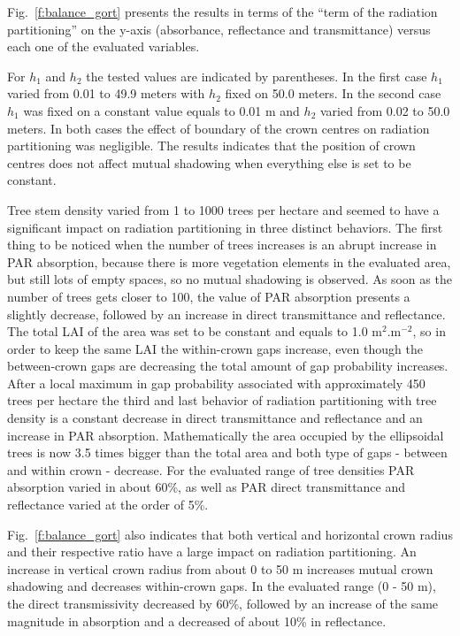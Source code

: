 Fig.~\ref{f:balance_gort} presents the results in terms of the “term of the radiation partitioning” on the y-axis (absorbance, reflectance and transmittance) versus each one of the evaluated variables. 

For $h_1$ and $h_2$ the tested values are indicated by parentheses. In the first case $h_1$ varied from 0.01 to 49.9 meters with $h_2$ fixed on 50.0 meters. In the second case $h_1$ was fixed on a constant value equals to 0.01 m and $h_2$ varied from 0.02 to 50.0 meters. In both cases the effect of boundary of the crown centres on radiation partitioning was negligible. The results indicates that the position of crown centres does not affect mutual shadowing when everything else is set to be constant.

Tree stem density varied from 1 to 1000 trees per hectare and seemed to have a significant impact on radiation partitioning in three distinct behaviors. The first thing to be noticed when the number of trees increases is an abrupt increase in PAR absorption, because there is more vegetation elements in the evaluated area, but still lots of empty spaces, so no mutual shadowing is observed. As soon as the number of trees gets closer to 100, the value of PAR absorption presents a slightly decrease, followed by an increase in direct transmittance and reflectance. The total LAI of the area was set to be constant and equals to 1.0 m$^2$.m$^{-2}$, so in order to keep the same LAI the within-crown gaps increase, even though the between-crown gaps are decreasing the total amount of gap probability increases. After a local maximum in gap probability associated with approximately 450 trees per hectare the third and last behavior of radiation partitioning with tree density is a constant decrease in direct transmittance and reflectance and an increase in PAR absorption. Mathematically the area occupied by the ellipsoidal trees is now 3.5 times bigger than the total area and both type of gaps - between and within crown - decrease. For the evaluated range of tree densities PAR absorption varied in about 60\%, as well as PAR direct transmittance and reflectance varied at the order of 5\%.

Fig.~\ref{f:balance_gort} also indicates that both vertical and horizontal crown radius and their respective ratio have a large impact on radiation partitioning. An increase in vertical crown radius from about 0 to 50 m increases mutual crown shadowing and decreases within-crown gaps. In the evaluated range (0 - 50 m), the direct transmissivity decreased by 60\%, followed by an increase of the same magnitude in absorption and a decreased of about 10\% in reflectance. 

